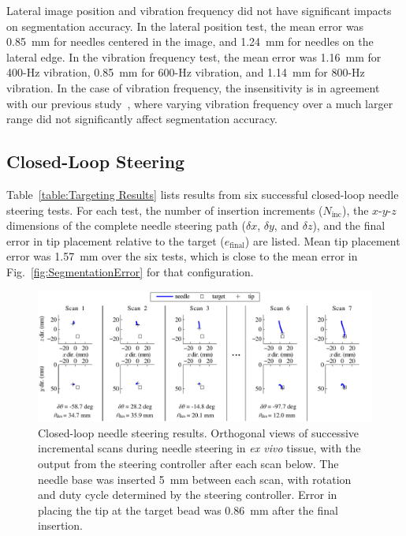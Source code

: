 Lateral image position and vibration frequency did not have significant impacts on segmentation accuracy. In the lateral position test, the mean error was 0.85~mm for needles centered in the image, and 1.24~mm for needles on the lateral edge. In the vibration frequency test, the mean error was 1.16~mm for 400-Hz vibration, 0.85~mm for 600-Hz vibration, and 1.14~mm for 800-Hz vibration. In the case of vibration frequency, the insensitivity is in agreement with our previous study~\cite{Adebar2013}, where varying vibration frequency over a much larger range did not significantly affect segmentation accuracy. 

\subsection{Closed-Loop Steering}
Table~\ref{table:Targeting Results} lists results from six successful closed-loop needle steering tests. For each test, the number of insertion increments ($N_{\text{inc}}$), the $x$-$y$-$z$ dimensions of the complete needle steering path ($\delta x$, $\delta y$, and $\delta z$), and the final error in tip placement relative to the target ($e_{\text{final}}$) are listed. Mean tip placement error was 1.57~mm over the six tests, which is close to the mean error in Fig.~\ref{fig:SegmentationError} for that configuration. 

\begin{figure}[!t]
\centering
\includegraphics[width = \textwidth]{Images/Chapter2/Steering/Steering}%
\caption[Closed-loop needle steering results]{Closed-loop needle steering results. Orthogonal views of successive incremental scans during needle steering in \textit{ex vivo} tissue, with the output from the steering controller after each scan below. The needle base was inserted 5~mm between each scan, with rotation and duty cycle determined by the steering controller. Error in placing the tip at the target bead was 0.86~mm after the final insertion.}
\label{fig:SucessfulSteering}
\end{figure}

